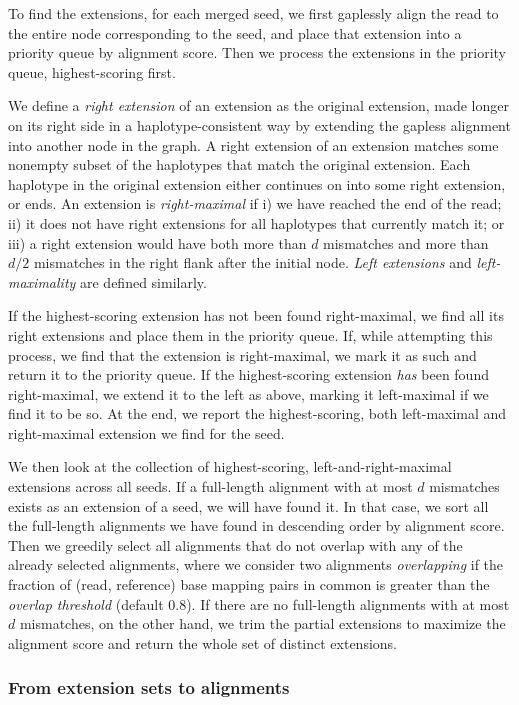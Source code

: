\documentclass[11pt]{ucscthesis}
\newcommand{\param}[1]{\emph{#1}}
\newcommand{\vocab}[1]{\emph{#1}}
\begin{document}
To find the extensions, for each merged seed, we first gaplessly align the read to the entire node corresponding to the seed, and place that extension into a priority queue by alignment score.
Then we process the extensions in the priority queue, highest-scoring first.

We define a \vocab{right extension} of an extension as the original extension, made longer on its right side in a haplotype-consistent way by extending the gapless alignment into another node in the graph.
A right extension of an extension matches some nonempty subset of the haplotypes that match the original extension.
Each haplotype in the original extension either continues on into some right extension, or ends.
An extension is \vocab{right-maximal} if i) we have reached the end of the read; ii) it does not have right extensions for all haplotypes that currently match it; or iii) a right extension would have both more than $d$ mismatches and more than $d/2$ mismatches in the right flank after the initial node.
\vocab{Left extensions} and \vocab{left-maximality} are defined similarly.

If the highest-scoring extension has not been found right-maximal, we find all its right extensions and place them in the priority queue.
If, while attempting this process, we find that the extension is right-maximal, we mark it as such and return it to the priority queue.
If the highest-scoring extension \emph{has} been found right-maximal, we extend it to the left as above, marking it left-maximal if we find it to be so.
At the end, we report the highest-scoring, both left-maximal and right-maximal extension we find for the seed.

We then look at the collection of highest-scoring, left-and-right-maximal extensions across all seeds.
If a full-length alignment with at most $d$ mismatches exists as an extension of a seed, we will have found it.
In that case, we sort all the full-length alignments we have found in descending order by alignment score.
Then we greedily select all alignments that do not overlap with any of the already selected alignments, where we consider two alignments \vocab{overlapping} if the fraction of (read, reference) base mapping pairs in common is greater than the \param{overlap threshold} (default 0.8).
If there are no full-length alignments with at most $d$ mismatches, on the other hand, we trim the partial extensions to maximize the alignment score and return the whole set of distinct extensions.

\subsubsection{From extension sets to alignments}
\label{sec:aim2:extensions-to-alignments}
\end{document}

